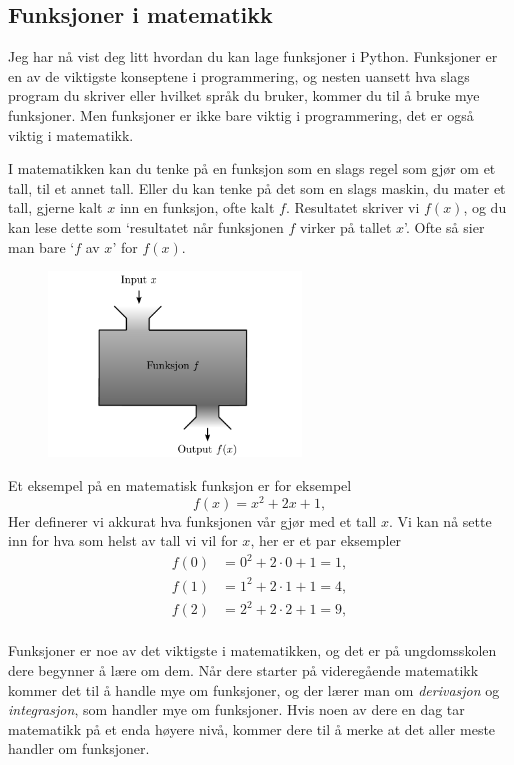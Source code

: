 \documentclass[a4paper, 11pt, notitlepage]{article}
\begin{document}
\subsection*{Funksjoner i matematikk}

Jeg har nå vist deg litt hvordan du kan lage funksjoner i Python. Funksjoner er en av de viktigste konseptene i programmering, og nesten uansett hva slags program du skriver eller hvilket språk du bruker, kommer du til å bruke mye funksjoner. Men funksjoner er ikke bare viktig i programmering, det er også viktig i matematikk.

I matematikken kan du tenke på en funksjon som en slags regel som gjør om et tall, til et annet tall. Eller du kan tenke på det som en slags maskin, du mater et tall, gjerne kalt $x$ inn en funksjon, ofte kalt $f$. Resultatet skriver vi $f(x)$, og du kan lese dette som `resultatet når funksjonen $f$ virker på tallet $x$'. Ofte så sier man bare `$f$ av $x$' for $f(x)$.

\begin{figure}[h]
\centering
	\includegraphics[width=0.6\textwidth]{function_blackbox}
\end{figure}

Et eksempel på en matematisk funksjon er for eksempel
$$f(x) = x^2 + 2x + 1,$$
Her definerer vi akkurat hva funksjonen vår gjør med et tall $x$. Vi kan nå sette inn for hva som helst av tall vi vil for $x$, her er et par eksempler
\begin{align*}
f(0) &= 0^2 + 2\cdot 0 + 1 = 1, \\
f(1) &= 1^2 + 2\cdot 1 + 1 = 4, \\
f(2) &= 2^2 + 2\cdot 2 + 1 = 9, \\
\end{align*}

Funksjoner er noe av det viktigste i matematikken, og det er på ungdomsskolen dere begynner å lære om dem. Når dere starter på videregående matematikk kommer det til å handle mye om funksjoner, og der lærer man om \emph{derivasjon} og \emph{integrasjon}, som handler mye om funksjoner. Hvis noen av dere en dag tar matematikk på et enda høyere nivå, kommer dere til å merke at det aller meste handler om funksjoner.
\end{document}
